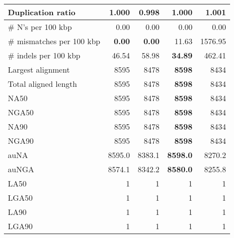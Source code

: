 \documentclass[12pt,a4paper]{article}
\begin{document}
\begin{table}[ht]
\begin{center}
\begin{tabular}{|l*{4}{|r}|}
Duplication ratio & 1.000 & {\bf 0.998} & 1.000 & 1.001 \\ \hline
\# N's per 100 kbp & 0.00 & 0.00 & 0.00 & 0.00 \\ \hline
\# mismatches per 100 kbp & {\bf 0.00} & {\bf 0.00} & 11.63 & 1576.95 \\ \hline
\# indels per 100 kbp & 46.54 & 58.98 & {\bf 34.89} & 462.41 \\ \hline
Largest alignment & 8595 & 8478 & {\bf 8598} & 8434 \\ \hline
Total aligned length & 8595 & 8478 & {\bf 8598} & 8434 \\ \hline
NA50 & 8595 & 8478 & {\bf 8598} & 8434 \\ \hline
NGA50 & 8595 & 8478 & {\bf 8598} & 8434 \\ \hline
NA90 & 8595 & 8478 & {\bf 8598} & 8434 \\ \hline
NGA90 & 8595 & 8478 & {\bf 8598} & 8434 \\ \hline
auNA & 8595.0 & 8383.1 & {\bf 8598.0} & 8270.2 \\ \hline
auNGA & 8574.1 & 8342.2 & {\bf 8580.0} & 8255.8 \\ \hline
LA50 & 1 & 1 & 1 & 1 \\ \hline
LGA50 & 1 & 1 & 1 & 1 \\ \hline
LA90 & 1 & 1 & 1 & 1 \\ \hline
LGA90 & 1 & 1 & 1 & 1 \\ \hline
\end{tabular}
\end{center}
\end{table}
\end{document}
